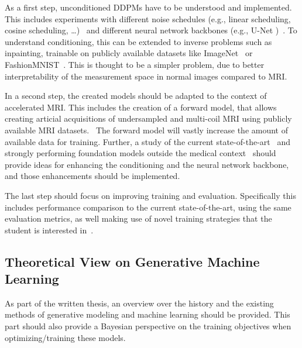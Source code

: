 \documentclass[a4paper]{article}
\begin{document}
As a first step, unconditioned DDPMs have to be understood and implemented. This includes experiments with different noise schedules (e.g., linear scheduling, cosine scheduling, \dots)~\cite{ho2020denoising,nichol2021improved} and different neural network backbones (e.g., U-Net )~\cite{ronneberger2015unet}. To understand conditioning, this can be extended to inverse problems such as inpainting, trainable on publicly available datasets like ImageNet~\cite{5206848} or FashionMNIST~\cite{xiao2017fashionmnist}. This is thought to be a simpler problem, due to better interpretability of the measurement space in normal images compared to MRI.

In a second step, the created models should be adapted to the context of accelerated MRI. This includes the creation of a forward model, that allows creating articial acquisitions of undersampled and multi-coil MRI using publicly available MRI datasets.~\cite{publicdatasetsCambridge} The forward model will vastly increase the amount of available data for training. Further, a study of the current state-of-the-art~\cite{10.1007/978-3-031-16446-0_62} and strongly performing foundation models outside the medical context~\cite{rombach2022highresolution} should provide ideas for enhancing the conditioning and the neural network backbone, and those enhancements should be implemented.

The last step should focus on improving training and evaluation. Specifically this includes performance comparison to the current state-of-the-art, using the same evaluation metrics, as well making use of novel training strategies that the student is interested in~\cite{loshchilov2017sgdr,micikevicius2018mixed}.

\subsection{Theoretical View on Generative Machine Learning}
As part of the written thesis, an overview over the history and the existing methods of generative modeling and machine learning should be provided. This part should also provide a Bayesian perspective on the training objectives when optimizing/training these models.
\end{document}
